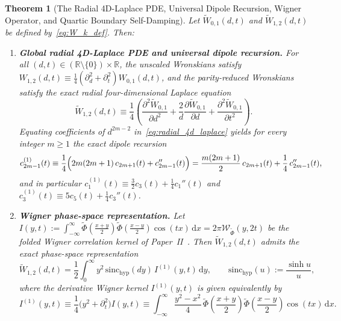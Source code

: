 \documentclass[11pt,reqno]{amsart}
\newtheorem{theorem}{Theorem}[section]
\theoremstyle{definition}
\theoremstyle{remark}
\numberwithin{equation}{section}
\newcommand{\R}{\mathbb{R}}
\newcommand{\dd}{\mathrm{d}}
\newcommand{\sinch}{\mathrm{sinc}_{\mathrm{hyp}}}
\begin{document}
\begin{theorem}[The Radial 4D-Laplace PDE, Universal Dipole Recursion, Wigner Operator, and Quartic Boundary Self-Damping]\label{thm:laplace_wigner}
Let $\widetilde{W}_{0,1}(d,t)$ and $\widetilde{W}_{1,2}(d,t)$ be defined by~\eqref{eq:W_k_def}. Then:
\begin{enumerate}[label=\textup{(\roman*)},leftmargin=2.2em]
\item \textbf{Global radial 4D-Laplace PDE and universal dipole recursion.} For all $(d,t) \in (\R\setminus\{0\}) \times \R$, the unscaled Wronskians satisfy $W_{1,2}(d,t) \equiv \frac{1}{4}(\partial_d^2 + \partial_t^2)W_{0,1}(d,t)$, and the parity-reduced Wronskians satisfy the exact radial four-dimensional Laplace equation
\begin{equation}\label{eq:radial_4d_laplace}
\widetilde{W}_{1,2}(d,t) \equiv \frac{1}{4}\left(\frac{\partial^2\widetilde{W}_{0,1}}{\partial d^2} + \frac{2}{d}\frac{\partial\widetilde{W}_{0,1}}{\partial d} + \frac{\partial^2\widetilde{W}_{0,1}}{\partial t^2}\right).
\end{equation}
Equating coefficients of $d^{2m-2}$ in~\eqref{eq:radial_4d_laplace} yields for every integer $m \ge 1$ the exact dipole recursion
\begin{equation}\label{eq:universal_dipole_recursion}
c_{2m-1}^{(1)}(t) \equiv \frac{1}{4}\Bigl(2m(2m+1)\,c_{2m+1}(t) + c_{2m-1}''(t)\Bigr) = \frac{m(2m+1)}{2}\,c_{2m+1}(t) + \frac{1}{4}\,c_{2m-1}''(t),
\end{equation}
and in particular $c_1^{(1)}(t) \equiv \frac{3}{2}c_3(t) + \frac{1}{4}c_1''(t)$ and $c_3^{(1)}(t) \equiv 5c_5(t) + \frac{1}{4}c_3''(t)$.
\item \textbf{Wigner phase-space representation.} Let $I(y,t) := \int_{-\infty}^\infty \widetilde{\Phi}(\frac{x+y}{2})\widetilde{\Phi}(\frac{x-y}{2})\cos(tx)\,\dd x = 2\pi\mathcal{W}_{\widetilde{\Phi}}(y, 2t)$ be the folded Wigner correlation kernel of Paper~II~\cite{missiaen2026paper2}. Then $\widetilde{W}_{1,2}(d,t)$ admits the exact phase-space representation
\begin{equation}\label{eq:wigner_W12_integral}
\widetilde{W}_{1,2}(d,t) = \frac{1}{2}\int_0^\infty y^2\,\sinch(dy)\,I^{(1)}(y,t)\,\dd y, \qquad \sinch(u) := \frac{\sinh u}{u},
\end{equation}
where the derivative Wigner kernel $I^{(1)}(y,t)$ is given equivalently by
\begin{equation}\label{eq:I1_wigner_operator}
I^{(1)}(y,t) \equiv \frac{1}{4}\bigl(y^2 + \partial_t^2\bigr)I(y,t) \equiv \int_{-\infty}^\infty \frac{y^2 - x^2}{4}\,\widetilde{\Phi}\!\left(\frac{x+y}{2}\right)\widetilde{\Phi}\!\left(\frac{x-y}{2}\right)\cos(tx)\,\dd x.

\end{equation}
\end{enumerate}
\end{theorem}
\end{document}

